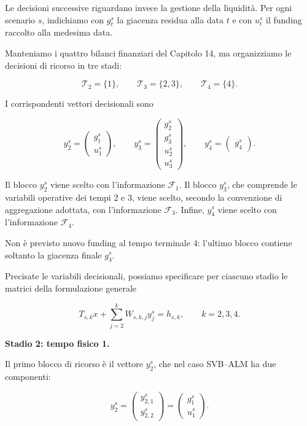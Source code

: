Le decisioni successive riguardano invece
la gestione della liquidit\`a. Per ogni
scenario $s$, indichiamo con $g_t^s$
la giacenza residua alla data $t$
e con $u_t^s$ il funding raccolto
alla medesima data.

Manteniamo i quattro bilanci finanziari
del Capitolo 14, ma organizziamo
le decisioni di ricorso in tre stadi:

\[
\mathcal T_2=\{1\},
\qquad
\mathcal T_3=\{2,3\},
\qquad
\mathcal T_4=\{4\}.
\]

I corrispondenti vettori decisionali sono

\[
y_2^s=
\begin{pmatrix}
g_1^s\\
u_1^s
\end{pmatrix},
\qquad
y_3^s=
\begin{pmatrix}
g_2^s\\
g_3^s\\
u_2^s\\
u_3^s
\end{pmatrix},
\qquad
y_4^s=
\begin{pmatrix}
g_4^s
\end{pmatrix}.
\]

Il blocco $y_2^s$ viene scelto con
l'informazione $\mathcal F_1$.
Il blocco $y_3^s$, che comprende
le variabili operative dei tempi $2$ e $3$,
viene scelto, secondo la convenzione
di aggregazione adottata, con
l'informazione $\mathcal F_3$.
Infine, $y_4^s$ viene scelto
con l'informazione $\mathcal F_4$.

Non \`e previsto nuovo funding al tempo
terminale $4$: l'ultimo blocco contiene
soltanto la giacenza finale $g_4^s$.

Precisate le variabili decisionali,
possiamo specificare per ciascuno stadio
le matrici della formulazione generale

\[
T_{s,k}x+
\sum_{j=2}^{k}W_{s,k,j}y_j^s
=
h_{s,k},
\qquad k=2,3,4.
\]

\medskip

\noindent
\textbf{Stadio 2: tempo fisico 1.}

Il primo blocco di ricorso \`e il vettore
$y_2^s$, che nel caso SVB--ALM ha due componenti:

\[
y_2^s
=
\begin{pmatrix}
y_{2,1}^s\\
y_{2,2}^s
\end{pmatrix}
=
\begin{pmatrix}
g_1^s\\
u_1^s
\end{pmatrix}.
\]


